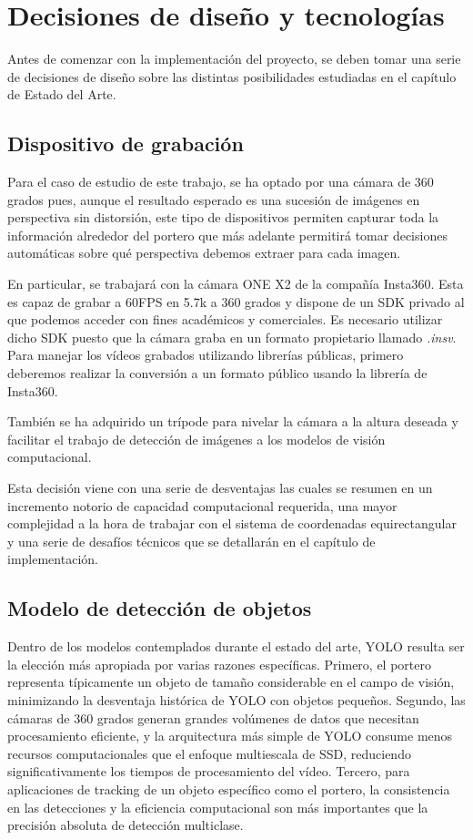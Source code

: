 \section[Decisiones de diseño]{Decisiones de diseño y tecnologías}
Antes de comenzar con la implementación del proyecto, se deben tomar una serie de decisiones de diseño sobre las distintas posibilidades estudiadas en el capítulo de Estado del Arte.

\subsection{Dispositivo de grabación}

Para el caso de estudio de este trabajo, se ha optado por una cámara de 360 grados pues, aunque el resultado esperado es una sucesión de imágenes en perspectiva sin distorsión, este tipo de dispositivos permiten capturar toda la información alrededor del portero que más adelante permitirá tomar decisiones automáticas sobre qué perspectiva debemos extraer para cada imagen.

En particular, se trabajará con la cámara ONE X2 de la compañía Insta360. Esta es capaz de grabar a 60FPS en 5.7k a 360 grados y dispone de un SDK privado \cite{insta360_media_sdk} al que podemos acceder con fines académicos y comerciales. Es necesario utilizar dicho SDK puesto que la cámara graba en un formato propietario llamado \textit{.insv}. Para manejar los vídeos grabados utilizando librerías públicas, primero deberemos realizar la conversión a un formato público usando la librería de Insta360.

También se ha adquirido un trípode para nivelar la cámara a la altura deseada y facilitar el trabajo de detección de imágenes a los modelos de visión computacional.

Esta decisión viene con una serie de desventajas las cuales se resumen en un incremento notorio de capacidad computacional requerida, una mayor complejidad a la hora de trabajar con el sistema de coordenadas equirectangular y una serie de desafíos técnicos que se detallarán en el capítulo de implementación.

\subsection{Modelo de detección de objetos}

Dentro de los modelos contemplados durante el estado del arte, YOLO resulta ser la elección más apropiada por varias razones específicas. Primero, el portero representa típicamente un objeto de tamaño considerable en el campo de visión, minimizando la desventaja histórica de YOLO con objetos pequeños. Segundo, las cámaras de 360 grados generan grandes volúmenes de datos que necesitan procesamiento eficiente, y la arquitectura más simple de YOLO consume menos recursos computacionales que el enfoque multiescala de SSD, reduciendo significativamente los tiempos de procesamiento del vídeo. Tercero, para aplicaciones de tracking de un objeto específico como el portero, la consistencia en las detecciones y la eficiencia computacional son más importantes que la precisión absoluta de detección multiclase.


